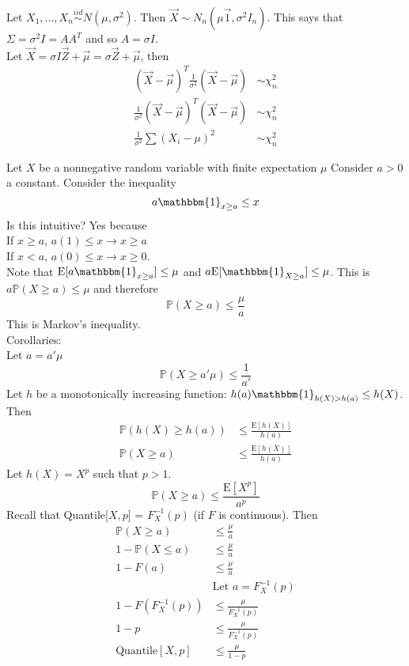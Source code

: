\documentclass[12pt]{article}
\newcommand{\prob}[1]{\mathbb{P}(#1)}
\newcommand{\indicator}[1]{\mathbbm{1}_{#1}}
\newcommand{\iid}{\stackrel{iid}{\sim}}
\newcommand{\expected}[1]{\mathrm{E}[#1]}
\begin{document}
Let $X_1, \dots, X_n \iid N(\mu, \sigma^2)$. Then $\vec{X} \sim N_n(\mu\vec{1}, \sigma^2I_n)$. This says that $\Sigma = \sigma^2I = AA^T$ and so $A = \sigma I$. \\
Let $\vec{X} = \sigma I\vec{Z} + \vec{\mu} = \sigma\vec{Z} + \vec{\mu}$, then $$ \begin{aligned} 
(\vec{X} - \vec{\mu})^T\frac{1}{\sigma^2}(\vec{X} - \vec{\mu}) &\sim \chi^2_n \\ \frac{1}{\sigma^2}(\vec{X} - \vec{\mu})^T(\vec{X} - \vec{\mu}) &\sim \chi^2_n \\ \frac{1}{\sigma^2} \sum (X_i - \mu)^2 &\sim \chi^2_n \end{aligned} $$ 

Let $X$ be a nonnegative random variable with finite expectation $\mu$ Consider $a > 0$ a constant. Consider the inequality $$ a\indicator{x \geq a} \leq x $$ Is this intuitive? Yes because \\ 
If $x \geq a$, $a(1) \leq x \to x \geq a$ \\
If $x < a$, $a(0) \leq x \to x \geq 0$. \\
Note that $\expected{a\indicator{x \geq a}} \leq \mu$ and $a\expected{\indicator{X \geq a}} \leq \mu$. This is $a\prob{X \geq a} \leq \mu$ and therefore $$ \prob{X \geq a} \leq \frac{\mu}{a} $$ This is Markov's inequality. \\
Corollaries: \\
Let $a = a'\mu$ $$\prob{X \geq a'\mu} \leq \frac{1}{a'} $$ Let $h$ be a monotonically increasing function: $h(a)\indicator{h(X) > h(a)} \leq h(X)$. Then $$ \begin{aligned} \prob{h(X) \geq h(a)} &\leq \frac{\expected{h(X)}}{h(a)} \\ \prob{X \geq a} &\leq \frac{\expected{h(X)}}{h(a)} \end{aligned} $$ 
Let $h(X) = X^p$ such that $p > 1$. $$ \prob{X \geq a} \leq \frac{\expected{X^p}}{a^p} $$ 
Recall that Quantile[$X,p$] = $F_X^{-1}(p)$ (if $F$ is continuous). Then $$ \begin{aligned} 
\prob{X \geq a} &\leq \frac{\mu}{a} \\ 1 - \prob{X \leq a} &\leq \frac{\mu}{a} \\ 1 - F(a) &\leq \frac{\mu}{a} \\ &\text{Let } a = F_X^{-1}(p) \\ 1 - F(F_X^{-1}(p)) &\leq \frac{\mu}{F_X^{-1}(p)}  \\ 1 - p &\leq \frac{\mu}{F_X^{-1}(p)} \\ \text{Quantile}[X,p] &\leq \frac{\mu}{1-p} \end{aligned} $$ 
\end{document}
